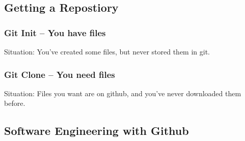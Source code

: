 \documentclass{beamer}
\begin{document}
\subsection[Getting a Repository]{Getting a Repostiory}

\begin{frame}
\frametitle{Git Init -- You have files}
\alert{Situation:} You've created some files, but never stored them in git.

\vspace{.05\textwidth}


\vspace{.05\textwidth}
\begin{enumerate}
\end{enumerate}
\end{frame}

\begin{frame}
\frametitle{Git Clone -- You need files}
\alert{Situation:} Files you want are on github, and you've never downloaded
them before.

\vspace{.05\textwidth}


\vspace{.05\textwidth}
\begin{enumerate}
\end{enumerate}
\end{frame}

\subsection[Github]{Software Engineering with Github}
\end{document}
